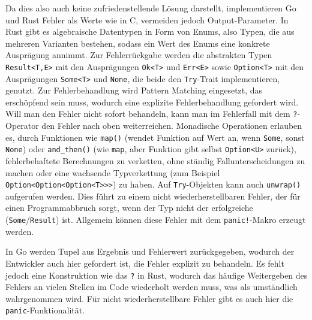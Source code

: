 Da dies also auch keine zufriedenstellende Lösung darstellt, implementieren Go und Rust Fehler als Werte wie in C, vermeiden jedoch Output-Parameter. In Rust gibt es algebraische Datentypen in Form von Enums, also Typen, die aus mehreren Varianten bestehen, sodass ein Wert des Enums eine konkrete Ausprägung annimmt. Zur Fehlerrückgabe werden die abstrakten Typen \texttt{Result<T,E>} mit den Ausprägungen \texttt{Ok<T>} und \texttt{Err<E>} sowie \texttt{Option<T>} mit den Ausprägungen \texttt{Some<T>} und \texttt{None}, die beide den \texttt{Try}-Trait implementieren, genutzt. Zur Fehlerbehandlung wird Pattern Matching eingesetzt, das erschöpfend sein muss, wodurch eine explizite Fehlerbehandlung gefordert wird. Will man den Fehler nicht sofort behandeln, kann man im Fehlerfall mit dem \texttt{?}-Operator den Fehler nach oben weiterreichen. Monadische Operationen erlauben es, durch Funktionen wie \texttt{map()} (wendet Funktion auf Wert an, wenn \texttt{Some}, sonst \texttt{None}) oder \texttt{and\_then()} (wie \texttt{map}, aber Funktion gibt selbst \texttt{Option<U>} zurück), fehlerbehaftete Berechnungen zu verketten, ohne ständig Fallunterscheidungen zu machen oder eine wachsende Typverkettung (zum Beispiel \texttt{Option<Option<Option<T>>>}) zu haben. Auf \texttt{Try}-Objekten kann auch \texttt{unwrap()} aufgerufen werden. Dies führt zu einem nicht wiederherstellbaren Fehler, der für einen Programmabbruch sorgt, wenn der Typ nicht der erfolgreiche (\texttt{Some}/\texttt{Result}) ist. Allgemein können diese Fehler mit dem \texttt{panic!}-Makro erzeugt werden.

\begin{figure}[htp]
	\centering
	
	\label{fig:try-rust}
\end{figure}

In Go werden Tupel aus Ergebnis und Fehlerwert zurückgegeben, wodurch der Entwickler auch hier gefordert ist, die Fehler explizit zu behandeln. Es fehlt jedoch eine Konstruktion wie das \texttt{?} in Rust, wodurch das häufige Weitergeben des Fehlers an vielen Stellen im Code wiederholt werden muss, was als umständlich wahrgenommen wird. Für nicht wiederherstellbare Fehler gibt es auch hier die \texttt{panic}-Funktionalität.

\begin{figure}[htp]
	\centering
	
	\label{fig:tuple}
\end{figure}

